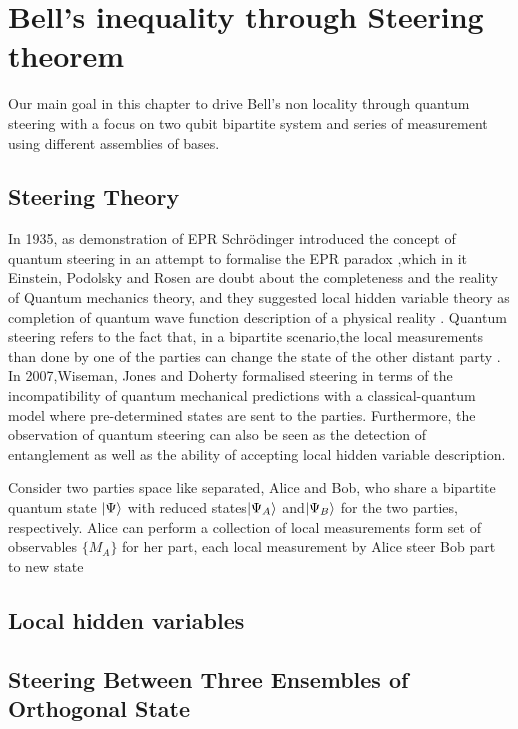 \chapter{Bell's inequality through Steering theorem}

Our  main goal in this chapter to drive Bell's non locality through quantum steering with a focus on two qubit bipartite  system and series of measurement using  different assemblies of bases.


\section{Steering Theory}

In 1935, as demonstration of EPR Schrödinger  introduced the concept of quantum steering in an attempt to formalise the EPR paradox \citep{schrodinger1935discussion},which in it Einstein, Podolsky and Rosen are doubt about the completeness and the reality of Quantum mechanics theory, and they suggested local hidden variable theory as completion of  quantum wave function description of  a physical reality \citep{EPR}. Quantum steering refers to the fact that, in a bipartite scenario,the local measurements  than done by one of the parties can change the state of the other distant party . In 2007,Wiseman, Jones and Doherty formalised steering in terms of the incompatibility of quantum mechanical predictions with a classical-quantum model where pre-determined states are sent to the parties. Furthermore, the observation of quantum steering can also be seen as the detection of entanglement as well as the ability of  accepting local hidden variable description\cite{Jevtic:2015:10.1364/JOSAB.32.000A50}.


Consider two parties space like separated, Alice and Bob, who share a bipartite quantum state $\ket{\Psi}$ with reduced states$\ket{\Psi_A}$ and$\ket{\Psi_B}$ for the two parties, respectively.  Alice can perform a collection of local measurements form set of observables $\{M_A\}$ for her part, each local measurement by Alice  steer Bob part to  new state  



\section{Local hidden variables}


\section{Steering Between Three Ensembles of Orthogonal State}
